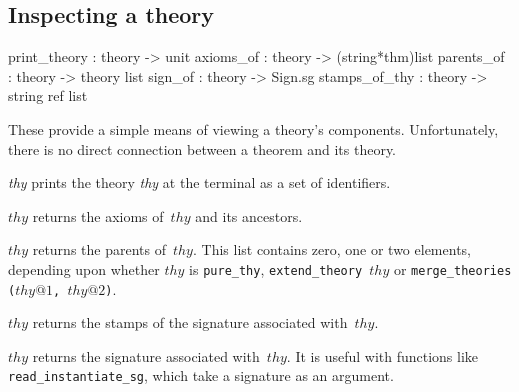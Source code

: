 \subsection{Inspecting a theory}
\begin{ttbox} 
print_theory  : theory -> unit
axioms_of     : theory -> (string*thm)list
parents_of    : theory -> theory list
sign_of       : theory -> Sign.sg
stamps_of_thy : theory -> string ref list
\end{ttbox}
These provide a simple means of viewing a theory's components.
Unfortunately, there is no direct connection between a theorem and its
theory.
\begin{ttdescription}
\item[\ttindexbold{print_theory} {\it thy}]  
prints the theory {\it thy\/} at the terminal as a set of identifiers.

\item[\ttindexbold{axioms_of} $thy$] 
returns the axioms of~$thy$ and its ancestors.

\item[\ttindexbold{parents_of} $thy$] 
returns the parents of~$thy$.  This list contains zero, one or two
elements, depending upon whether $thy$ is {\tt pure_thy}, 
\hbox{\tt extend_theory $thy$} or \hbox{\tt merge_theories ($thy@1$, $thy@2$)}.

\item[\ttindexbold{stamps_of_thy} $thy$]
returns the stamps of the signature associated with~$thy$.

\item[\ttindexbold{sign_of} $thy$] 
returns the signature associated with~$thy$.  It is useful with functions
like {\tt read_instantiate_sg}, which take a signature as an argument.
\end{ttdescription}



